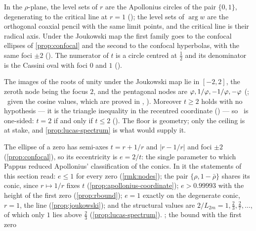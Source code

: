 \begin{proposition}\label{prop:pencils}
In the $\rho$-plane, the level sets of $r$ are the Apollonius circles of the pair
$\{0,1\}$, degenerating to the critical line at $r=1$
(); the level sets of
$\arg w$ are the orthogonal coaxial pencil with the same limit points, and the
critical line is their radical axis.  Under the Joukowski map the first family
goes to the confocal ellipses of \cref{prop:confocal} and the second to the
confocal hyperbolas, with the same foci $\pm2$
().  The numerator of $t$ is a circle
centred at $\tfrac12$ and its denominator is the Cassini oval with foci $0$ and
$1$ ().
\end{proposition}

\begin{remark}\label{rmk:nodes}
The images of the roots of unity under the Joukowski map lie in $[-2,2]$, the
zeroth node being the focus $2$, and the pentagonal nodes are
$\varphi,1/\varphi,-1/\varphi,-\varphi$
(;
\ given the cosine values, which are
proved in , ).  Moreover $t\ge2$ holds with no
hypothesis --- it is the triangle inequality in the recentred coordinate
() --- so \Ecore\ is one-sided:
$t=2$ if and only if $t\le2$ ().  The floor is
geometry; only the ceiling is at stake, and \cref{prop:lucas-spectrum} is what
would supply it.
\end{remark}

\begin{remark}\label{rmk:pappus}
The ellipse of a zero has semi-axes $t=r+1/r$ and $|r-1/r|$ and foci $\pm2$ (\cref{prop:confocal}), so its
eccentricity is $e=2/t$: the single parameter to which Pappus reduced Apollonius' classification of
the conics.  In it the statements of this section read: $e\le1$ for every zero
(\cref{rmk:nodes}); the pair $\{\rho,1-\bar\rho\}$ shares its conic, since $r\mapsto1/r$ fixes $t$
(\cref{prop:apollonius-coordinate}); $e>0.99993$ with the height of the first zero (\cref{prop:rbound}); $e=1$ exactly on the degenerate conic, $r=1$, the line (\cref{prop:joukowski}); and the structural values are
$2/L_{2m}=1,\tfrac23,\tfrac27,\dots$, of which only $1$ lies above $\tfrac23$ (\cref{prop:lucas-spectrum}).
; the bound with the first zero
\end{remark}

